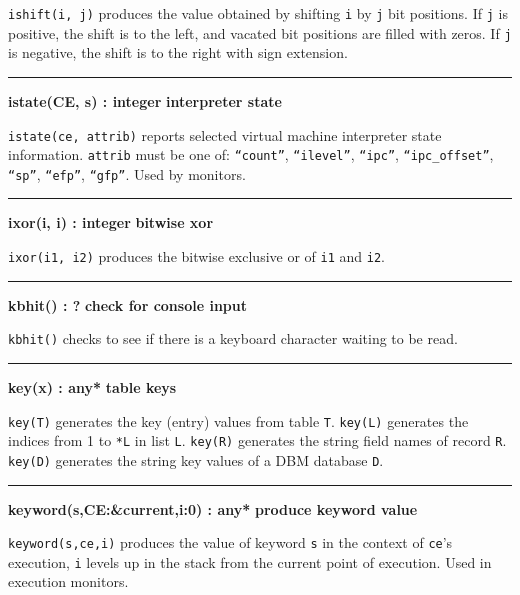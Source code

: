 \noindent
{}\texttt{ishift(i, j)} produces the value obtained by
shifting \texttt{i} by \texttt{j} bit positions.
If \texttt{j} is positive, the shift is to the left, and vacated bit
positions are filled with zeros.
If \texttt{j} is negative, the shift is to the right with sign extension. 

\bigskip\hrule\vspace{0.1cm}
\noindent
{\bf istate(CE, s) : integer } \hfill {\bf interpreter state}

\noindent
\texttt{istate(ce, attrib)} reports selected virtual machine interpreter
state information. \texttt{attrib} must be one of:
\texttt{{\textquotedblleft}count{\textquotedblright}},
\texttt{{\textquotedblleft}ilevel{\textquotedblright}},
\texttt{{\textquotedblleft}ipc{\textquotedblright}},
\texttt{{\textquotedblleft}ipc\_offset{\textquotedblright}},
\texttt{{\textquotedblleft}sp{\textquotedblright}},
\texttt{{\textquotedblleft}efp{\textquotedblright}},
\texttt{{\textquotedblleft}gfp{\textquotedblright}}. Used by monitors.

\bigskip\hrule\vspace{0.1cm}
\noindent
{\bf ixor(i, i) : integer } \hfill {\bf bitwise xor}

\noindent
\texttt{ixor(i1, i2)} produces the bitwise exclusive
or of \texttt{i1} and \texttt{i2}.

\bigskip\hrule\vspace{0.1cm}
\noindent
{\bf kbhit() : ? } \hfill {\bf check for console input}

\noindent
{}\texttt{kbhit()} checks to see if there is a
keyboard character waiting to be read.

\bigskip\hrule\vspace{0.1cm}
\noindent
{\bf key(x) : any* } \hfill {\bf table keys}\WarningNotThreadSafe

\noindent
{}\texttt{key(T)} generates the key (entry) values from
table \texttt{T}. \texttt{key(L)} generates the indices from 1 to
\texttt{*L} in list \texttt{L}. \texttt{key(R)} generates the string
field names of record \texttt{R}.
\texttt{key(D)} generates the string key values of a DBM database \texttt{D}.

\bigskip\hrule\vspace{0.1cm}
\noindent
{\bf keyword(s,CE:\&current,i:0) : any* } \hfill {\bf produce keyword value}

\noindent
{}\texttt{keyword(s,ce,i)} produces the value of keyword
\texttt{s} in the context of \texttt{ce}'s execution,
\texttt{i} levels up in the stack from the current point of execution.
Used in execution monitors.

